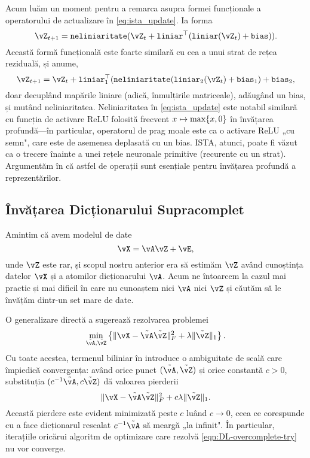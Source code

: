 \documentclass[../../book-main_ro.tex]{subfiles}
\begin{document}
Acum luăm un moment pentru a remarca asupra formei funcționale a operatorului de actualizare în \eqref{eq:ista_update}. Ia forma 
\begin{equation}
    \vZ_{t + 1} = \texttt{neliniaritate}(\vZ_{t} + \texttt{liniar}^{\top}(\texttt{liniar}(\vZ_{t}) + \texttt{bias})).
\end{equation}
Această formă funcțională este foarte similară cu cea a unui strat de rețea reziduală, și anume,
\begin{equation}
    \vZ_{t + 1} = \vZ_{t} + \texttt{liniar}_{1}^{\top}(\texttt{neliniaritate}(\texttt{liniar}_{2}(\vZ_{t}) + \texttt{bias}_{1}) + \texttt{bias}_{2},
\end{equation}
doar decuplând mapările liniare (adică, înmulțirile matriceale), adăugând un bias, și mutând neliniaritatea. 
Neliniaritatea în \eqref{eq:ista_update} este notabil similară cu
funcția de activare ReLU folosită frecvent $x \mapsto \max\set{x, 0}$ în învățarea
profundă---în particular, operatorul de prag moale este ca o activare
ReLU „cu semn", care este de asemenea deplasată cu un bias.
ISTA, atunci, poate fi văzut ca o trecere înainte a unei rețele neuronale primitive (recurente cu un strat). Argumentăm în  că astfel de operații sunt esențiale pentru învățarea profundă a reprezentărilor.




\subsection{Învățarea Dicționarului Supracomplet} 

Amintim că avem modelul de date 
\begin{equation}\label{eq:overcomplete-dl-section-data-model}
    \vX = \vA\vZ + \vE,
\end{equation}
unde \(\vZ\) este rar, și scopul nostru anterior era să estimăm \(\vZ\) având
cunoștința datelor \(\vX\) și a atomilor dicționarului \(\vA\). Acum ne întoarcem la
cazul mai practic și mai dificil în care nu cunoaștem
nici \(\vA\) nici \(\vZ\) și căutăm să le învățăm dintr-un set mare de date. 

O generalizare directă a  sugerează rezolvarea problemei
\begin{equation}
    \min_{\tilde{\vA}, \tilde{\vZ}}\bc{\norm{\vX - \tilde{\vA}\tilde{\vZ}}_{F}^{2} + \lambda \norm{\tilde{\vZ}}_{1}}.
    \label{eqn:DL-overcomplete-try}
\end{equation}
Cu toate acestea, termenul biliniar în  introduce o
ambiguitate de scală care împiedică convergența: având orice punct $(\tilde{\vA},
\tilde{\vZ})$ și orice constantă $c>0$, substituția
$(c^{-1}\tilde{\vA}, c\tilde{\vZ})$ dă valoarea pierderii
\begin{equation}
    \norm{\vX - \tilde{\vA}\tilde{\vZ}}_{F}^{2} + c\lambda \norm{\tilde{\vZ}}_{1}.
\end{equation}
Această pierdere este evident minimizată peste $c$ luând $c \to 0$, ceea ce corespunde
cu a face dicționarul rescalat $c^{-1} \tilde{\vA}$ să meargă „la infinit". În
particular, iterațiile oricărui algoritm de optimizare care rezolvă
\eqref{eqn:DL-overcomplete-try} nu vor converge.
\end{document}
